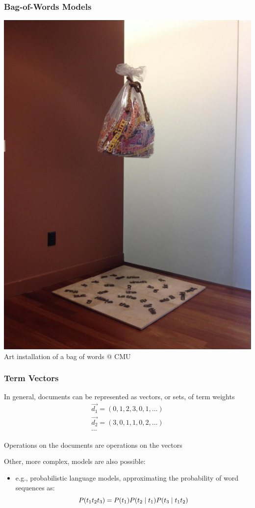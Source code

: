 \documentclass[svgnames]{beamer}
\begin{document}
\begin{frame}
    \frametitle{Bag-of-Words Models}

    \begin{center}
        \includegraphics[width=.5\linewidth]{bag-of-words-sculpture}\\
        \raggedleft \footnotesize Art installation of a bag of words @ CMU  
    \end{center}
\end{frame}


\begin{frame}
    \frametitle{Term Vectors}

    \begin{block}{}
        In general, documents can be represented as vectors, or sets, of term
        weights
        \begin{displaymath}
            \begin{array}{ll}
              \vec{d_1} = ( 0, 1, 2, 3, 0, 1, \ldots ) \\
              \vec{d_2} = ( 3, 0, 1, 1, 0, 2, \ldots ) \\
              \cdots
            \end{array}
        \end{displaymath}

        Operations on the documents are operations on the vectors
        
    \end{block}

    \begin{block}{}
        Other, more complex, models are also possible:
        \begin{itemize}
        \item e.g., probabilistic language models, approximating the probability of word sequences as:
            \begin{displaymath}\footnotesize
                P(t_{1}t_{2}t_{3})=P(t_{1})P(t_{2}\mid t_{1})P(t_{3}\mid t_{1}t_{2})
            \end{displaymath}
        \end{itemize}
    \end{block}


\end{frame}
\end{document}
